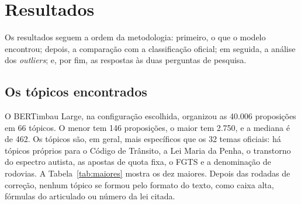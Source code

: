 
\section{Resultados}
\label{sec:resultados}

Os resultados seguem a ordem da metodologia: primeiro, o que o modelo encontrou; depois, a comparação com a classificação oficial; em seguida, a análise dos \textit{outliers}; e, por fim, as respostas às duas perguntas de pesquisa.

\subsection{Os tópicos encontrados}
\label{subsec:res-topicos}

O BERTimbau Large, na configuração escolhida, organizou as 40.006 proposições em 66 tópicos. O menor tem 146 proposições, o maior tem 2.750, e a mediana é de 462. Os tópicos são, em geral, mais específicos que os 32 temas oficiais: há tópicos próprios para o Código de Trânsito, a Lei Maria da Penha, o transtorno do espectro autista, as apostas de quota fixa, o FGTS e a denominação de rodovias. A Tabela~\ref{tab:maiores} mostra os dez maiores. Depois das rodadas de correção, nenhum tópico se formou pelo formato do texto, como caixa alta, fórmulas do articulado ou número da lei citada.

